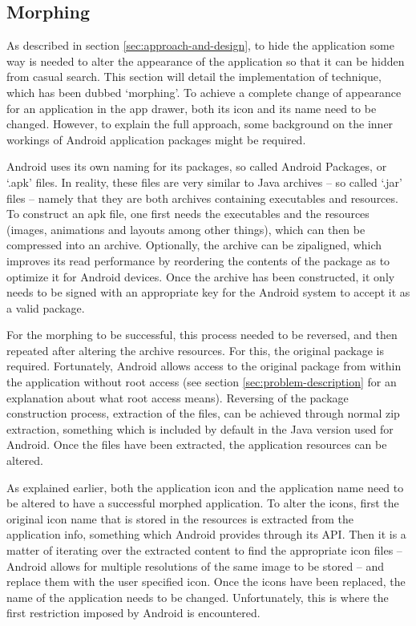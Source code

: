 \subsection{Morphing}
\label{sec:morphing}

As described in section \ref{sec:approach-and-design}, to hide the application some way is needed to alter the appearance of the application so that it can be hidden from casual search.
This section will detail the implementation of technique, which has been dubbed `morphing'.
To achieve a complete change of appearance for an application in the app drawer, both its icon and its name need to be changed. 
However, to explain the full approach, some background on the inner workings of Android application packages might be required.

Android uses its own naming for its packages, so called Android Packages, or `.apk' files.
In reality, these files are very similar to Java archives -- so called `.jar' files -- namely that they are both archives containing executables and resources.
To construct an apk file, one first needs the executables and the resources (images, animations and layouts among other things), which can then be compressed into an archive.
Optionally, the archive can be zipaligned, which improves its read performance by reordering the contents of the package as to optimize it for Android devices.
Once the archive has been constructed, it only needs to be signed with an appropriate key for the Android system to accept it as a valid package.

For the morphing to be successful, this process needed to be reversed, and then repeated after altering the archive resources.
For this, the original package is required. 
Fortunately, Android allows access to the original package from within the application without root access (see section \ref{sec:problem-description} for an explanation about what root access means).
Reversing of the package construction process, extraction of the files, can be achieved through normal zip extraction, something which is included by default in the Java version used for Android.
Once the files have been extracted, the application resources can be altered.

As explained earlier, both the application icon and the application name need to be altered to have a successful morphed application.
To alter the icons, first the original icon name that is stored in the resources is extracted from the application info, something which Android provides through its API.
Then it is a matter of iterating over the extracted content to find the appropriate icon files -- Android allows for multiple resolutions of the same image to be stored -- and replace them with the user specified icon.
Once the icons have been replaced, the name of the application needs to be changed.
Unfortunately, this is where the first restriction imposed by Android is encountered.

